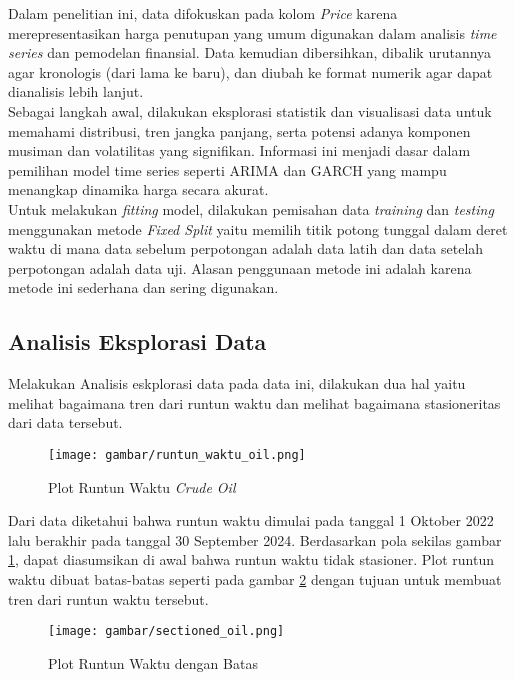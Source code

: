 \documentclass[a4paper,12pt]{article}
\begin{document}
Dalam penelitian ini, data difokuskan pada kolom \textit{Price} karena merepresentasikan harga penutupan yang umum digunakan dalam analisis \textit{time series} dan pemodelan finansial. Data kemudian dibersihkan, dibalik urutannya agar kronologis (dari lama ke baru), dan diubah ke format numerik agar dapat dianalisis lebih lanjut. \\

Sebagai langkah awal, dilakukan eksplorasi statistik dan visualisasi data untuk memahami distribusi, tren jangka panjang, serta potensi adanya komponen musiman dan volatilitas yang signifikan. Informasi ini menjadi dasar dalam pemilihan model time series seperti ARIMA dan GARCH yang mampu menangkap dinamika harga secara akurat. \\

Untuk melakukan \textit{fitting} model, dilakukan pemisahan data \textit{training} dan \textit{testing} menggunakan metode \textit{Fixed Split} yaitu memilih titik potong tunggal dalam deret waktu di mana data sebelum perpotongan adalah data latih dan data setelah perpotongan adalah data uji. Alasan penggunaan metode ini adalah karena metode ini sederhana dan sering digunakan.

\subsection{Analisis Eksplorasi Data}

Melakukan Analisis eskplorasi data pada data ini, dilakukan dua hal yaitu melihat bagaimana tren dari runtun waktu dan melihat bagaimana stasioneritas dari data tersebut.

\begin{figure}[hbt!]
    \centering
    \texttt{[image: gambar/runtun\_waktu\_oil.png]}
    \caption{Plot Runtun Waktu \textit{Crude Oil}}
    \label{fig:minyak gan}
\end{figure}

Dari data diketahui bahwa runtun waktu dimulai pada tanggal 1 Oktober 2022 lalu berakhir pada tanggal 30 September 2024. Berdasarkan pola sekilas gambar \ref{fig:minyak gan}, dapat diasumsikan di awal bahwa runtun waktu tidak stasioner. Plot runtun waktu dibuat batas-batas seperti pada gambar \ref{fig:sectioned} dengan tujuan untuk membuat tren dari runtun waktu tersebut.

\begin{figure}[hbt!]
    \centering
    \texttt{[image: gambar/sectioned\_oil.png]}
    \caption{Plot Runtun Waktu dengan Batas}
    \label{fig:sectioned}
\end{figure}
\end{document}
